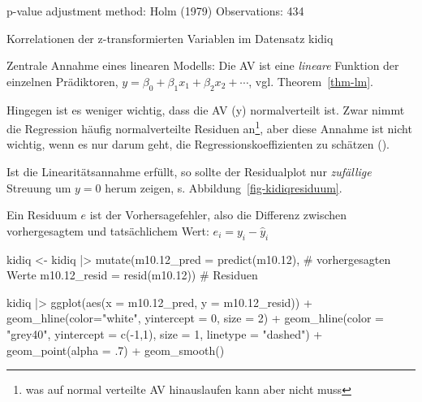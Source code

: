 \documentclass[
  ngerman,
  letterpaper,
  twoside,
  open=any]{scrbook}
\newenvironment{Shaded}{\begin{snugshade}}{\end{snugshade}}
\newcommand{\AttributeTok}[1]{\textcolor[rgb]{0.40,0.45,0.13}{#1}}
\newcommand{\CommentTok}[1]{\textcolor[rgb]{0.37,0.37,0.37}{#1}}
\newcommand{\DecValTok}[1]{\textcolor[rgb]{0.68,0.00,0.00}{#1}}
\newcommand{\FloatTok}[1]{\textcolor[rgb]{0.68,0.00,0.00}{#1}}
\newcommand{\FunctionTok}[1]{\textcolor[rgb]{0.28,0.35,0.67}{#1}}
\newcommand{\NormalTok}[1]{\textcolor[rgb]{0.00,0.23,0.31}{#1}}
\newcommand{\OtherTok}[1]{\textcolor[rgb]{0.00,0.23,0.31}{#1}}
\newcommand{\SpecialCharTok}[1]{\textcolor[rgb]{0.37,0.37,0.37}{#1}}
\newcommand{\StringTok}[1]{\textcolor[rgb]{0.13,0.47,0.30}{#1}}
\theoremstyle{definition}
\theoremstyle{plain}
\theoremstyle{definition}
\theoremstyle{definition}
\theoremstyle{definition}
\theoremstyle{definition}
\theoremstyle{remark}
\begin{document}
p-value adjustment method: Holm (1979) Observations: 434

Korrelationen der z-transformierten Variablen im Datensatz kidiq

Zentrale Annahme eines linearen Modells: Die AV ist eine \emph{lineare}
Funktion der einzelnen Prädiktoren,
\(y= \beta_0 + \beta_1x_1 + \beta_2 x_2 + \cdots\), vgl.
Theorem~\ref{thm-lm}.

Hingegen ist es weniger wichtig, dass die AV (y) normalverteilt ist.
Zwar nimmt die Regression häufig normalverteilte Residuen an\footnote{was
  auf normal verteilte AV hinauslaufen kann aber nicht muss}, aber diese
Annahme ist nicht wichtig, wenn es nur darum geht, die
Regressionskoeffizienten zu schätzen ().

Ist die Linearitätsannahme erfüllt, so sollte der Residualplot nur
\emph{zufällige} Streuung um \(y=0\) herum zeigen, s.
Abbildung~\ref{fig-kidiqresiduum}.

Ein Residuum \(e\) ist der Vorhersagefehler, also die Differenz zwischen
vorhergesagtem und tatsächlichem Wert: \(e_i = y_i - \hat{y}_i\)

\begin{Shaded}
\begin{Highlighting}[]
\NormalTok{kidiq }\OtherTok{\textless{}{-}}
\NormalTok{  kidiq }\SpecialCharTok{|\textgreater{}} 
  \FunctionTok{mutate}\NormalTok{(}\AttributeTok{m10.12\_pred =} \FunctionTok{predict}\NormalTok{(m10}\FloatTok{.12}\NormalTok{),  }\CommentTok{\# vorhergesagten Werte}
         \AttributeTok{m10.12\_resid =} \FunctionTok{resid}\NormalTok{(m10}\FloatTok{.12}\NormalTok{))  }\CommentTok{\# Residuen}
\end{Highlighting}
\end{Shaded}

\begin{Shaded}
\begin{Highlighting}[]
\NormalTok{kidiq }\SpecialCharTok{|\textgreater{}} 
  \FunctionTok{ggplot}\NormalTok{(}\FunctionTok{aes}\NormalTok{(}\AttributeTok{x =}\NormalTok{ m10}\FloatTok{.12}\NormalTok{\_pred, }\AttributeTok{y =}\NormalTok{ m10}\FloatTok{.12}\NormalTok{\_resid)) }\SpecialCharTok{+}
  \FunctionTok{geom\_hline}\NormalTok{(}\AttributeTok{color=}\StringTok{"white"}\NormalTok{, }\AttributeTok{yintercept =} \DecValTok{0}\NormalTok{, }\AttributeTok{size =} \DecValTok{2}\NormalTok{) }\SpecialCharTok{+}
  \FunctionTok{geom\_hline}\NormalTok{(}\AttributeTok{color =} \StringTok{"grey40"}\NormalTok{, }
             \AttributeTok{yintercept =} \FunctionTok{c}\NormalTok{(}\SpecialCharTok{{-}}\DecValTok{1}\NormalTok{,}\DecValTok{1}\NormalTok{), }
             \AttributeTok{size =} \DecValTok{1}\NormalTok{, }
             \AttributeTok{linetype =} \StringTok{"dashed"}\NormalTok{) }\SpecialCharTok{+}
  \FunctionTok{geom\_point}\NormalTok{(}\AttributeTok{alpha =}\NormalTok{ .}\DecValTok{7}\NormalTok{) }\SpecialCharTok{+}
  \FunctionTok{geom\_smooth}\NormalTok{()}
\end{Highlighting}
\end{Shaded}
\end{document}
